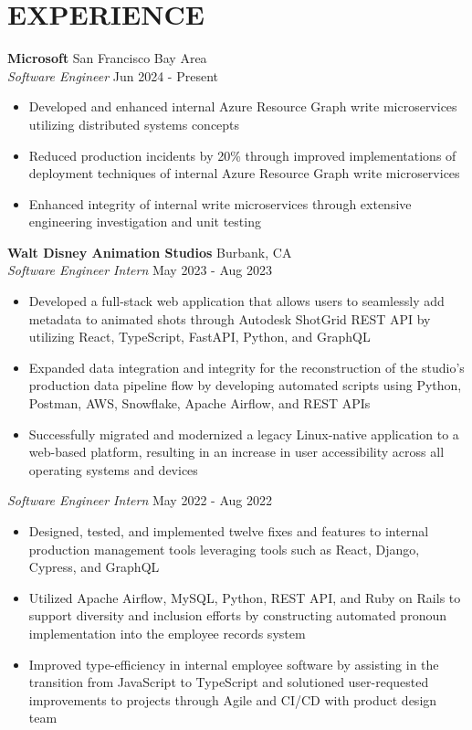 \documentclass[a4paper,10pt]{extarticle}
\begin{document}
\section*{EXPERIENCE}

\noindent
\textbf{Microsoft} \hfill San Francisco Bay Area \\ %
\textit{Software Engineer} \hfill Jun 2024 - Present %
\begin{itemize}
    \item Developed and enhanced internal Azure Resource Graph write microservices utilizing distributed systems concepts
    \item Reduced production incidents by 20\% through improved implementations of deployment techniques of internal Azure Resource Graph write microservices
    \item Enhanced integrity of internal write microservices through extensive engineering investigation and unit testing %
\end{itemize}

\noindent
\textbf{Walt Disney Animation Studios} \hfill Burbank, CA \\ %
\textit{Software Engineer Intern} \hfill May 2023 - Aug 2023 %
\begin{itemize}
    \item Developed a full-stack web application that allows users to seamlessly add metadata to animated shots through Autodesk ShotGrid REST API by utilizing React, TypeScript, FastAPI, Python, and GraphQL
    \item Expanded data integration and integrity for the reconstruction of the studio’s production data pipeline flow by developing automated scripts using Python, Postman, AWS, Snowflake, Apache Airflow, and REST APIs
    \item Successfully migrated and modernized a legacy Linux-native application to a web-based platform, resulting in an increase in user accessibility across all operating systems and devices %
\end{itemize}

\noindent
\textit{Software Engineer Intern} \hfill May 2022 - Aug 2022 %
\begin{itemize}
    \item Designed, tested, and implemented twelve fixes and features to internal production management tools leveraging tools such as React, Django, Cypress, and GraphQL
    \item Utilized Apache Airflow, MySQL, Python, REST API, and Ruby on Rails to support diversity and inclusion efforts by constructing automated pronoun implementation into the employee records system
    \item Improved type-efficiency in internal employee software by assisting in the transition from JavaScript to TypeScript and solutioned user-requested improvements to projects through Agile and CI/CD with product design team %
\end{itemize}
\end{document}
